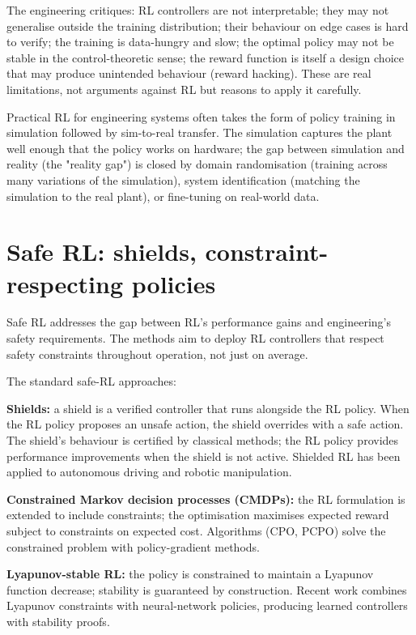 The engineering critiques: RL controllers are not interpretable; they may not generalise outside the training distribution; their behaviour on edge cases is hard to verify; the training is data-hungry and slow; the optimal policy may not be stable in the control-theoretic sense; the reward function is itself a design choice that may produce unintended behaviour (reward hacking). These are real limitations, not arguments against RL but reasons to apply it carefully.

Practical RL for engineering systems often takes the form of policy training in simulation followed by sim-to-real transfer. The simulation captures the plant well enough that the policy works on hardware; the gap between simulation and reality (the "reality gap") is closed by domain randomisation (training across many variations of the simulation), system identification (matching the simulation to the real plant), or fine-tuning on real-world data.

\section{Safe RL: shields, constraint-respecting policies}

Safe RL addresses the gap between RL's performance gains and engineering's safety requirements. The methods aim to deploy RL controllers that respect safety constraints throughout operation, not just on average.

The standard safe-RL approaches:

\textbf{Shields:} a shield is a verified controller that runs alongside the RL policy. When the RL policy proposes an unsafe action, the shield overrides with a safe action. The shield's behaviour is certified by classical methods; the RL policy provides performance improvements when the shield is not active. Shielded RL has been applied to autonomous driving and robotic manipulation.

\textbf{Constrained Markov decision processes (CMDPs):} the RL formulation is extended to include constraints; the optimisation maximises expected reward subject to constraints on expected cost. Algorithms (CPO, PCPO) solve the constrained problem with policy-gradient methods.

\textbf{Lyapunov-stable RL:} the policy is constrained to maintain a Lyapunov function decrease; stability is guaranteed by construction. Recent work combines Lyapunov constraints with neural-network policies, producing learned controllers with stability proofs.

